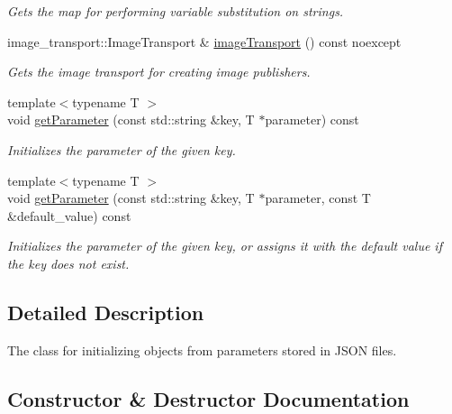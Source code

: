 \begin{DoxyCompactItemize}
\begin{DoxyCompactList}\small\item\em Gets the map for performing variable substitution on strings. \end{DoxyCompactList}\item 
image\+\_\+transport\+::\+Image\+Transport \& \hyperlink{classstereo__ugv_1_1Context_a62b2e85a2c109ff079324fe5fbf0fe92}{image\+Transport} () const noexcept
\begin{DoxyCompactList}\small\item\em Gets the image transport for creating image publishers. \end{DoxyCompactList}\item 
{\footnotesize template$<$typename T $>$ }\\void \hyperlink{classstereo__ugv_1_1Context_a1996f3d3213ab26a3ba84a1c0cf7b62e}{get\+Parameter} (const std\+::string \&key, T $\ast$parameter) const
\begin{DoxyCompactList}\small\item\em Initializes the parameter of the given key. \end{DoxyCompactList}\item 
{\footnotesize template$<$typename T $>$ }\\void \hyperlink{classstereo__ugv_1_1Context_a8e7e25d1efa5c92a84830824c0effa27}{get\+Parameter} (const std\+::string \&key, T $\ast$parameter, const T \&default\+\_\+value) const
\begin{DoxyCompactList}\small\item\em Initializes the parameter of the given key, or assigns it with the default value if the key does not exist. \end{DoxyCompactList}\end{DoxyCompactItemize}


\subsection{Detailed Description}
The class for initializing objects from parameters stored in J\+S\+ON files. 

\subsection{Constructor \& Destructor Documentation}
\mbox{\label{classstereo__ugv_1_1Context_a408832fdf3245f3d91c9ea794ebbc71c}} 
